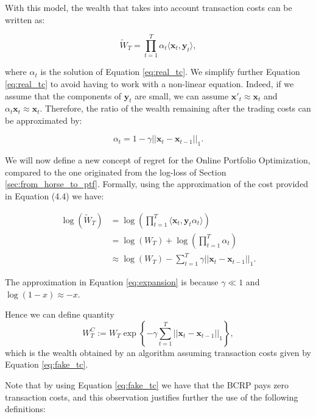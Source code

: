 With this model, the wealth that takes into account transaction costs
can be written as:

\begin{equation} \label{eq:realwealth}
    \tilde W_T = \prod\limits_{t=1}^T \alpha_t\langle \mathbf{x}_t, \mathbf{y}_t \rangle,
\end{equation}

where $\alpha_t$ is the solution of Equation \eqref{eq:real_tc}. We simplify further Equation \eqref{eq:real_tc} to avoid having to work with a non-linear equation. Indeed, if we assume that the components of $\mathbf y_t$ are small, we can assume $\mathbf x'_t\approx \mathbf x_t$ and $\alpha_t\mathbf x_t\approx\mathbf x_t$. Therefore, the ratio of the wealth remaining after the trading costs can be approximated by:

\begin{equation}\label{eq:fake_tc}
\alpha_t=1-\gamma||\mathbf x_t-\mathbf x_{t-1}||_1.
\end{equation}

We will now define a new concept of regret for the Online Portfolio Optimization, compared to the one originated from the log-loss of Section \ref{sec:from_horse_to_ptf}. 
Formally, using the approximation of the cost provided in Equation (4.4) we have:

\begin{align}
    \log(\tilde W_T)&=\log\left(\prod\limits_{t=1}^T  \langle \mathbf{x}_t, \mathbf{y}_t \alpha_t\rangle\right) \\ 
    & = \log(W_T)+\log\left(\prod\limits_{t=1}^T \alpha_t\right) \\ 
    & \approx \log(W_T) - \sum\limits_{t=1}^T\gamma||\mathbf{x}_t-\mathbf{x}_{t-1}||_1. \label{eq:expansion}
\end{align}

The approximation in Equation \eqref{eq:expansion} is because $\gamma\ll1$ and $\log(1-x)\approx-x$.

Hence we can define quantity 
\begin{equation}\label{eq:l1_wealth}
W_T^C:=W_T\exp\left\{-\gamma\sum\limits_{t=1}^T||\mathbf{x}_t-\mathbf{x}_{t-1}||_1\right\},
\end{equation} 
which is the wealth obtained by an algorithm assuming transaction costs given by Equation \eqref{eq:fake_tc}.


Note that by using Equation \eqref{eq:fake_tc} we have that the BCRP pays zero transaction costs, and this observation justifies further the use of the following definitions:

